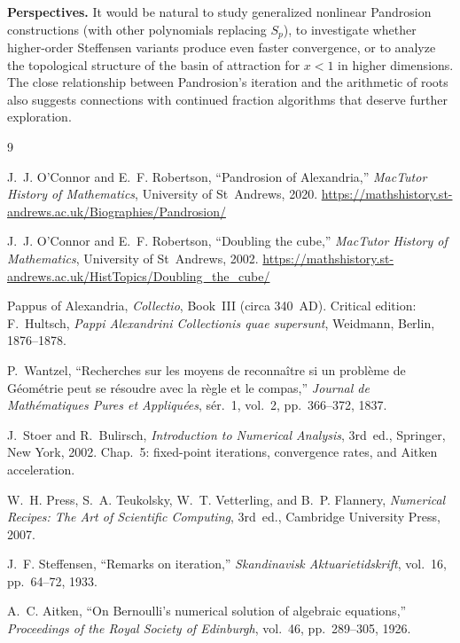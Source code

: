 \documentclass[11pt,a4paper]{article}
\theoremstyle{definition}
\begin{document}
\medskip

\textbf{Perspectives.} It would be natural to study generalized nonlinear Pandrosion constructions (with other polynomials replacing $S_p$), to investigate whether higher-order Steffensen variants produce even faster convergence, or to analyze the topological structure of the basin of attraction for $x < 1$ in higher dimensions. The close relationship between Pandrosion's iteration and the arithmetic of roots also suggests connections with continued fraction algorithms that deserve further exploration.

\begin{thebibliography}{9}

J.~J. O'Connor and E.~F. Robertson,
``Pandrosion of Alexandria,''
\textit{MacTutor History of Mathematics}, University of St~Andrews, 2020.
\url{https://mathshistory.st-andrews.ac.uk/Biographies/Pandrosion/}

J.~J. O'Connor and E.~F. Robertson,
``Doubling the cube,''
\textit{MacTutor History of Mathematics}, University of St~Andrews, 2002.
\url{https://mathshistory.st-andrews.ac.uk/HistTopics/Doubling_the_cube/}

Pappus of Alexandria,
\textit{Collectio}, Book~III (circa 340~AD).
Critical edition: F.~Hultsch, \textit{Pappi Alexandrini Collectionis quae supersunt},
Weidmann, Berlin, 1876--1878.

P.~Wantzel,
``Recherches sur les moyens de reconna\^itre si un probl\`eme de G\'eom\'etrie peut se r\'esoudre avec la r\`egle et le compas,''
\textit{Journal de Math\'ematiques Pures et Appliqu\'ees}, s\'er.~1, vol.~2, pp.~366--372, 1837.

J.~Stoer and R.~Bulirsch,
\textit{Introduction to Numerical Analysis},
3rd~ed., Springer, New York, 2002.
Chap.~5: fixed-point iterations, convergence rates, and Aitken acceleration.

W.~H. Press, S.~A. Teukolsky, W.~T. Vetterling, and B.~P. Flannery,
\textit{Numerical Recipes: The Art of Scientific Computing},
3rd~ed., Cambridge University Press, 2007.

J.~F. Steffensen,
``Remarks on iteration,''
\textit{Skandinavisk Aktuarietidskrift}, vol.~16, pp.~64--72, 1933.

A.~C. Aitken,
``On Bernoulli's numerical solution of algebraic equations,''
\textit{Proceedings of the Royal Society of Edinburgh}, vol.~46, pp.~289--305, 1926.

\end{thebibliography}
\end{document}
